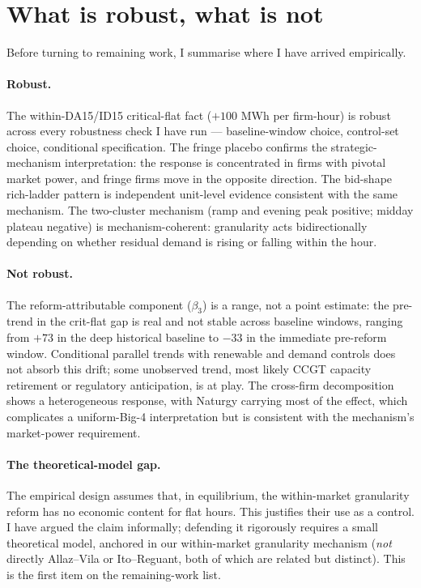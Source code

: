\documentclass[11pt,a4paper]{article}
\begin{document}
\section{What is robust, what is not}

Before turning to remaining work, I summarise where I have arrived empirically.

\paragraph{Robust.} The within-DA15/ID15 critical-flat fact ($+100$ MWh per firm-hour) is robust across every robustness check I have run --- baseline-window choice, control-set choice, conditional specification. The fringe placebo confirms the strategic-mechanism interpretation: the response is concentrated in firms with pivotal market power, and fringe firms move in the opposite direction. The bid-shape rich-ladder pattern is independent unit-level evidence consistent with the same mechanism. The two-cluster mechanism (ramp and evening peak positive; midday plateau negative) is mechanism-coherent: granularity acts bidirectionally depending on whether residual demand is rising or falling within the hour.

\paragraph{Not robust.} The reform-attributable component ($\beta_3$) is a range, not a point estimate: the pre-trend in the crit-flat gap is real and not stable across baseline windows, ranging from $+73$ in the deep historical baseline to $-33$ in the immediate pre-reform window. Conditional parallel trends with renewable and demand controls does not absorb this drift; some unobserved trend, most likely CCGT capacity retirement or regulatory anticipation, is at play. The cross-firm decomposition shows a heterogeneous response, with Naturgy carrying most of the effect, which complicates a uniform-Big-4 interpretation but is consistent with the mechanism's market-power requirement.

\paragraph{The theoretical-model gap.} The empirical design assumes that, in equilibrium, the within-market granularity reform has no economic content for flat hours. This justifies their use as a control. I have argued the claim informally; defending it rigorously requires a small theoretical model, anchored in our within-market granularity mechanism (\emph{not} directly Allaz--Vila or Ito--Reguant, both of which are related but distinct). This is the first item on the remaining-work list.
\end{document}
